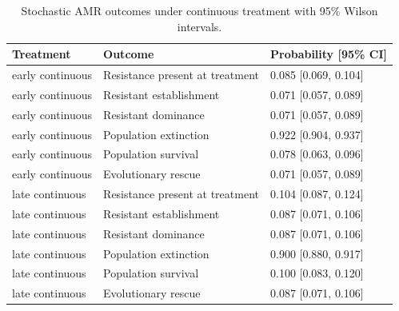 \begin{table}
\caption{Stochastic AMR outcomes under continuous treatment with 95\% Wilson intervals.}
\label{tab:stochastic_outcomes}
\begin{tabular}{lll}
\toprule
Treatment & Outcome & Probability [95\% CI] \\
\midrule
early continuous & Resistance present at treatment & 0.085 [0.069, 0.104] \\
early continuous & Resistant establishment & 0.071 [0.057, 0.089] \\
early continuous & Resistant dominance & 0.071 [0.057, 0.089] \\
early continuous & Population extinction & 0.922 [0.904, 0.937] \\
early continuous & Population survival & 0.078 [0.063, 0.096] \\
early continuous & Evolutionary rescue & 0.071 [0.057, 0.089] \\
late continuous & Resistance present at treatment & 0.104 [0.087, 0.124] \\
late continuous & Resistant establishment & 0.087 [0.071, 0.106] \\
late continuous & Resistant dominance & 0.087 [0.071, 0.106] \\
late continuous & Population extinction & 0.900 [0.880, 0.917] \\
late continuous & Population survival & 0.100 [0.083, 0.120] \\
late continuous & Evolutionary rescue & 0.087 [0.071, 0.106] \\
\bottomrule
\end{tabular}
\end{table}
